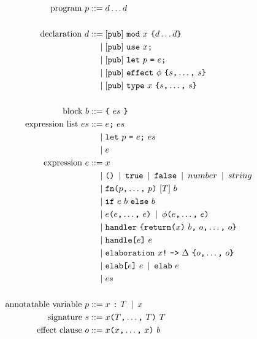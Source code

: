 \begin{figure}[p]
\begin{align*}
    \text{program}\ p
        \IS & d \dots d\\
    \\
    \text{declaration}\ d
        \IS & \opt{\tok{pub}}\ \tok{mod}\ x\ \tok{\{} \rep{d} \tok{\}}\\
        \OR & \opt{\tok{pub}}\ \tok{use}\ x\tok{;}\\
        \OR & \opt{\tok{pub}}\ \tok{let}\ p\ \tok{=}\ e\tok{;}\\
        \OR & \opt{\tok{pub}}\ \tok{effect}\ \phi\ \tok{\{} \csep{s} \tok{\}}\\
        \OR & \opt{\tok{pub}}\ \tok{type}\ x\ \tok{\{} \csep{s} \tok{\}}\\
    \\
    \text{block}\ b
        \IS & \tok{\{}\ es\ \tok{\}}\\
    \text{expression list}\ es
        \IS & e\tok{;}\ es\\
        \OR & \tok{let}\ p\ \tok{=}\ e\tok{;}\ es\\
        \OR & e\\
    \text{expression}\ e
        \IS & x\\
        \OR & \tok{()} \OR \tok{true} \OR \tok{false} \OR number \OR string \\
        \OR & \tok{fn} \tok{(} \csep{p} \kw{)}\ [T]\ b \\
        \OR & \tok{if}\ e\ b\ \tok{else}\ b\\
        \OR & e\tok{(} \csep{e} \tok{)} \OR \phi\tok{(} \csep{e} \tok{)} \\
        \OR & \tok{handler}\ \tok{\{} \tok{return} \tok{(}x\tok{)}\ b \tok{,}\ \csep{o} \tok{\}}\\
        \OR & \tok{handle}\tok{[}e\tok{]}\ e \\
        \OR & \tok{elaboration}\ x\tok{!}\ \tok{->}\ \Delta\ \tok{\{} \csep{o} \tok{\}}\\
        \OR & \tok{elab}\tok{[} e \tok{]}\ e \OR \tok{elab}\ e \\
        \OR & es\\
    \\
    \text{annotatable variable}\ p
        \IS & x\ \tok{:}\ T \OR x\\
    \text{signature}\ s
        \IS & x \tok{(} \csep{T} \tok{)}\ T\\
    \text{effect clause}\ o
        \IS & x \tok{(} \csep{x} \tok{)}\ b\\

\end{align*}
\end{figure}
